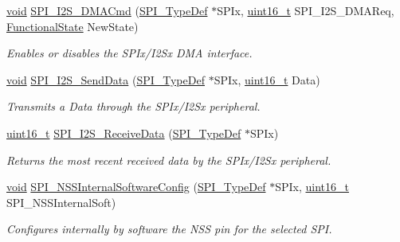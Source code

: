 \begin{DoxyCompactItemize}
\hyperlink{usb__devapi_8h_afabf60e7f57651d6d595a02c75f07cd0}{void} \hyperlink{group___s_p_i___private___functions_gabed5b91a8576e6d578f364cc0e807e4a}{S\+P\+I\+\_\+\+I2\+S\+\_\+\+D\+M\+A\+Cmd} (\hyperlink{struct_s_p_i___type_def}{S\+P\+I\+\_\+\+Type\+Def} $\ast$S\+P\+Ix, \hyperlink{_p_e___types_8h_a1f1825b69244eb3ad2c7165ddc99c956}{uint16\+\_\+t} S\+P\+I\+\_\+\+I2\+S\+\_\+\+D\+M\+A\+Req, \hyperlink{agilefox_2library_2inc_2stm32f10x__type_8h_ac9a7e9a35d2513ec15c3b537aaa4fba1}{Functional\+State} New\+State)
\begin{DoxyCompactList}\small\item\em Enables or disables the S\+P\+Ix/\+I2\+Sx D\+MA interface. \end{DoxyCompactList}\item 
\hyperlink{usb__devapi_8h_afabf60e7f57651d6d595a02c75f07cd0}{void} \hyperlink{group___s_p_i___private___functions_gad5af40bebe8dbe3fa8bd476489d7e3da}{S\+P\+I\+\_\+\+I2\+S\+\_\+\+Send\+Data} (\hyperlink{struct_s_p_i___type_def}{S\+P\+I\+\_\+\+Type\+Def} $\ast$S\+P\+Ix, \hyperlink{_p_e___types_8h_a1f1825b69244eb3ad2c7165ddc99c956}{uint16\+\_\+t} Data)
\begin{DoxyCompactList}\small\item\em Transmits a Data through the S\+P\+Ix/\+I2\+Sx peripheral. \end{DoxyCompactList}\item 
\hyperlink{_p_e___types_8h_a1f1825b69244eb3ad2c7165ddc99c956}{uint16\+\_\+t} \hyperlink{group___s_p_i___private___functions_gab77de76547f3bff403236b263b070a30}{S\+P\+I\+\_\+\+I2\+S\+\_\+\+Receive\+Data} (\hyperlink{struct_s_p_i___type_def}{S\+P\+I\+\_\+\+Type\+Def} $\ast$S\+P\+Ix)
\begin{DoxyCompactList}\small\item\em Returns the most recent received data by the S\+P\+Ix/\+I2\+Sx peripheral. \end{DoxyCompactList}\item 
\hyperlink{usb__devapi_8h_afabf60e7f57651d6d595a02c75f07cd0}{void} \hyperlink{group___s_p_i___private___functions_ga56fc508a482f032f9eb80e4c63184126}{S\+P\+I\+\_\+\+N\+S\+S\+Internal\+Software\+Config} (\hyperlink{struct_s_p_i___type_def}{S\+P\+I\+\_\+\+Type\+Def} $\ast$S\+P\+Ix, \hyperlink{_p_e___types_8h_a1f1825b69244eb3ad2c7165ddc99c956}{uint16\+\_\+t} S\+P\+I\+\_\+\+N\+S\+S\+Internal\+Soft)
\begin{DoxyCompactList}\small\item\em Configures internally by software the N\+SS pin for the selected S\+PI. \end{DoxyCompactList}\item 

\end{DoxyCompactItemize}
